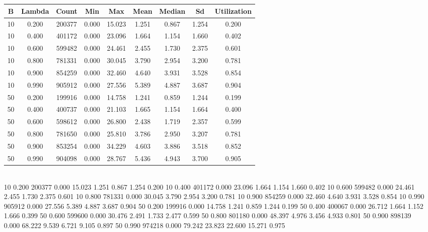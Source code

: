 \documentclass{article}
\begin{document}
\section{}

\section{}
\begin{tabular}{c | c | c | c | c | c | c | c | c}
	B & Lambda & Count & Min & Max & Mean & Median & Sd & Utilization \\
	\hline
	10 & 0.200 & 200377 & 0.000 & 15.023 & 1.251 & 0.867 & 1.254 & 0.200 \\   
	10 & 0.400 & 401172 & 0.000 & 23.096 & 1.664 & 1.154 & 1.660 & 0.402 \\
	10 & 0.600 & 599482 & 0.000 & 24.461 & 2.455 & 1.730 & 2.375 & 0.601 \\    
	10 & 0.800 & 781331 & 0.000 & 30.045 & 3.790 & 2.954 & 3.200 & 0.781 \\    
	10 & 0.900 & 854259 & 0.000 & 32.460 & 4.640 & 3.931 & 3.528 & 0.854 \\    
	10 & 0.990 & 905912 & 0.000 & 27.556 & 5.389 & 4.887 & 3.687 & 0.904 \\    
	50 & 0.200 & 199916 & 0.000 & 14.758 & 1.241 & 0.859 & 1.244 & 0.199 \\    
	50 & 0.400 & 400737 & 0.000 & 21.103 & 1.665 & 1.154 & 1.664 & 0.400 \\    
	50 & 0.600 & 598612 & 0.000 & 26.800 & 2.438 & 1.719 & 2.357 & 0.599 \\    
	50 & 0.800 & 781650 & 0.000 & 25.810 & 3.786 & 2.950 & 3.207 & 0.781 \\    
	50 & 0.900 & 853254 & 0.000 & 34.229 & 4.603 & 3.886 & 3.518 & 0.852 \\    
	50 & 0.990 & 904098 & 0.000 & 28.767 & 5.436 & 4.943 & 3.700 & 0.905 \\  
\end{tabular} \\

10 0.200     200377    0.000     15.023    1.251     0.867     1.254     0.200    
10 0.400     401172    0.000     23.096    1.664     1.154     1.660     0.402    
10 0.600     599482    0.000     24.461    2.455     1.730     2.375     0.601    
10 0.800     781331    0.000     30.045    3.790     2.954     3.200     0.781    
10 0.900     854259    0.000     32.460    4.640     3.931     3.528     0.854    
10 0.990     905912    0.000     27.556    5.389     4.887     3.687     0.904    
50 0.200     199916    0.000     14.758    1.241     0.859     1.244     0.199    
50 0.400     400067    0.000     26.712    1.664     1.152     1.666     0.399    
50 0.600     599600    0.000     30.476    2.491     1.733     2.477     0.599    
50 0.800     801180    0.000     48.397    4.976     3.456     4.933     0.801    
50 0.900     898139    0.000     68.222    9.539     6.721     9.105     0.897    
50 0.990     974218    0.000     79.242    23.823    22.600    15.271    0.975 
\end{document}
